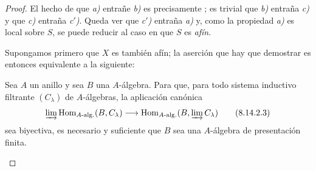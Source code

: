 \begin{proof}
El hecho de que \emph{a)} entrañe \emph{b)} es precisamente ; es trivial que \emph{b)} entraña \emph{c)} y que \emph{c)} entraña \emph{c$'$)}.
Queda ver que \emph{c$'$)} entraña \emph{a)} y, como la propiedad \emph{a)} es local sobre $S$, se puede reducir al caso en que $S$ es \emph{afín}.

Supongamos primero que $X$ es también afín; la aserción que hay que demostrar es entonces equivalente a la siguiente:

\begin{corollary}[8.14.2.2]
\label{IV.8.14.2.2-fr}
Sea $A$ un anillo y sea $B$ una $A$-álgebra.
Para que, para todo sistema inductivo filtrante $(C_\lambda)$ de $A$-álgebras, la aplicación canónica
\begin{equation}
\label{IV.8.14.2.3-fr}
\varinjlim\operatorname{Hom}_{A\text{-}\mathrm{alg.}}(B,C_\lambda)
\longrightarrow
\operatorname{Hom}_{A\text{-}\mathrm{alg.}}
(B,\varinjlim C_\lambda) \tag{8.14.2.3}
\end{equation}
sea biyectiva, es necesario y suficiente que $B$ sea una $A$-álgebra de presentación finita.
\end{corollary}


\end{proof}
